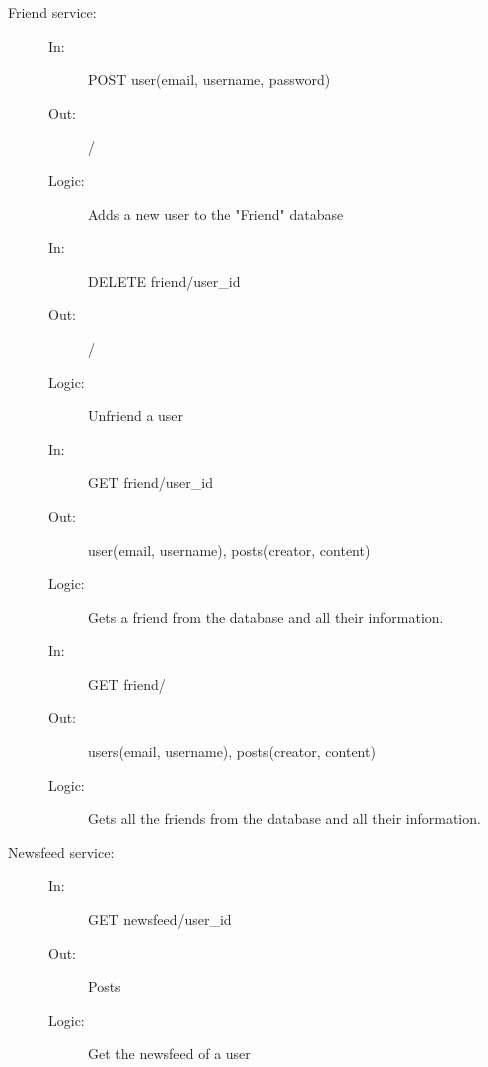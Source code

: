 \documentclass{article}
\begin{document}
\begin{description}
    \item [Friend service:] 
    \begin{description}
        \item[]
        \item[In:] POST user(email, username, password)
        \item[Out:] /
        \item[Logic:] Adds a new user to the "Friend" database
        \item[]
    \end{description}
    \begin{description}
        \item[]
        \item[In:] DELETE friend/user\_id
        \item[Out:] /
        \item[Logic:] Unfriend a user
        \item[]
    \end{description}
    \begin{description}
        \item[]
        \item[In:] GET friend/user\_id
        \item[Out:] user(email, username), posts(creator, content)
        \item[Logic:] Gets a friend from the database and all their information.
        \item[]
    \end{description}
    \begin{description}
        \item[]
        \item[In:] GET friend/
        \item[Out:] users(email, username), posts(creator, content)
        \item[Logic:] Gets all the friends from the database and all their information.
        \item[]
    \end{description}
\end{description}

\begin{description}
    \item [Newsfeed service:] 
    \begin{description}
        \item[]
        \item[In:] GET newsfeed/user\_id
        \item[Out:] Posts
        \item[Logic:] Get the newsfeed of a user
    \end{description}
\end{description}
\end{document}

